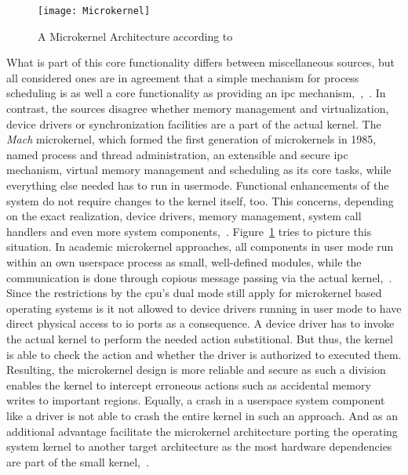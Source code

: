 \begin{figure} [t]
	\centering
	\texttt{[image: Microkernel]}
	\caption{A Microkernel Architecture according to~\cite{lfd430}}\label{pic:microkernel}
\end{figure}

What is part of this core functionality differs between miscellaneous sources, but all considered ones are in agreement that a simple mechanism for process scheduling is as well a core functionality as providing an \ac{ipc} mechanism\cite{lfd430},~\cite{silberschatz2009operating},~\cite{glatz2015betriebssysteme}.  
In contrast, the sources disagree whether memory management and virtualization, device drivers or synchronization facilities are a part of the actual kernel.
The \textit{Mach} microkernel, which formed the first generation of microkernels in 1985, named process and thread administration, an extensible and secure \ac{ipc} mechanism, virtual memory management and scheduling as its core tasks, while everything else needed has to run in usermode\cite{rashidMach}.
Functional enhancements of the system do not require changes to the kernel itself, too.
This concerns, depending on the exact realization, device drivers, memory management, system call handlers and even more system components\cite{lfd430},~\cite{silberschatz2009operating}.
Figure~\ref{pic:microkernel} tries to picture this situation.
In academic microkernel approaches, all components in user mode run within an own userspace process as small, well-defined modules, while the communication is done through copious message passing via the actual kernel\cite{tanenbaum-modern-operating-systems},~\cite{lfd430}.
Since the restrictions by the \ac{cpu}'s dual mode still apply for microkernel based operating systems is it not allowed to device drivers running in user mode to have direct physical access to \ac{io} ports as a consequence.
A device driver has to invoke the actual kernel to perform the needed action substitional.
But thus, the kernel is able to check the action and whether the driver is authorized to executed them.
Resulting, the microkernel design is more reliable and secure as such a division enables the kernel to intercept erroneous actions such as accidental memory writes to important regions\cite{tanenbaum-modern-operating-systems}.
Equally, a crash in a userspace system component like a driver is not able to crash the entire kernel in such an approach. 
And as an additional advantage facilitate the microkernel architecture porting the operating system kernel to another target architecture as the most hardware dependencies are part of the small kernel\cite{silberschatz2009operating},~\cite{lfd430}.

